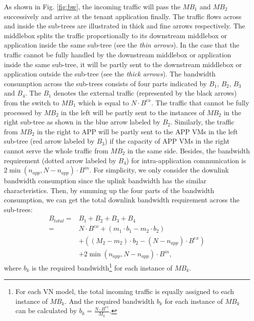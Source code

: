 \documentclass[review]{elsarticle}
\begin{document}
As shown in Fig. \ref{fig:bw}, the incoming traffic will pass the $MB_1$ and $MB_2$ successively and  arrive at the tenant application finally. The traffic flows across and inside the sub-trees are illustrated in thick and fine arrows respectively. %
The middlebox splits the traffic proportionally to its downstream middlebox or application inside the same sub-tree (see the \emph{thin arrows}). 
In the case that the traffic cannot be fully handled by the downstream middlebox or application inside the same sub-tree, it will be partly sent to the downstream middlebox or application outside the sub-tree (see the \emph{thick arrows}). 
The bandwidth consumption across the sub-trees consists of four parts indicated by $B_1$, $B_2$, $B_3$ and $B_4$. The $B_1$ denotes the external traffic (represented by the black arrows) from the switch to $MB_1$ which is equal to $N\cdot B^{ex}$. The traffic that cannot be fully processed by $MB_2$ in the left will be partly sent to the instances of $MB_2$ in the right sub-tree as shown in the blue arrow labeled by $B_2$. Similarly, the traffic from $MB_2$ in the right to APP will be partly sent to the APP VMs in the left sub-tree (red arrow labeled by $B_3$) if the capacity of APP VMs in the right cannot serve the whole traffic from $MB_2$ in the same side. Besides, the bandwidth requirement (dotted arrow labeled by $B_4$) for intra-application communication is $2\min(n_{app}  ,N-n_{app})\cdot B^{in}$. For simplicity, we only consider the downlink bandwidth consumption since the uplink bandwidth has the similar characteristics. %
Then, by summing up the four parts of the bandwidth consumption, we can get the total downlink bandwidth requirement across the sub-trees:
\begin{equation}
\begin{aligned}
B_{total} = &B_1+B_2+B_3+B_4 \\
=&N \cdot B^{ex}+(m_1 \cdot b_1-m_2\cdot b_2)\\
&+((M_2-m_2)\cdot b_2-(N-n_{app})\cdot B^{ex})\\
&+2\min(n_{app}, N-n_{app})\cdot B^{in},
\end{aligned}
\end{equation}
where $b_k$ is the required bandwidth\footnote{For each VN model, %
	the total incoming traffic is equally assigned to each instance of $MB_k$. And the required bandwidth $b_k$ for each instance of $MB_k$ can be calculated by 
	$b_{k}=\frac{N\cdot B^{ex}}{M_{k}}$.
	}  for each instance of $MB_k$.
	
\end{document}
